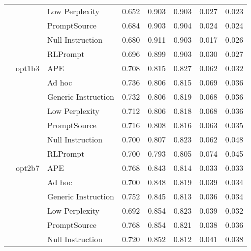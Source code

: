 \begin{supertabular}{lllrrrrr}
              &        & Low Perplexity &            0.652 &           0.903 &          0.903 &        0.027 &    0.023 \\
              &        & PromptSource &            0.684 &           0.903 &          0.904 &        0.024 &    0.024 \\
              &        & Null Instruction &            0.680 &           0.911 &          0.903 &        0.017 &    0.026 \\
              &        & RLPrompt &            0.696 &           0.899 &          0.903 &        0.030 &    0.027 \\
              & opt1b3 & APE &            0.708 &           0.815 &          0.827 &        0.062 &    0.032 \\
              &        & Ad hoc &            0.736 &           0.806 &          0.815 &        0.069 &    0.036 \\
              &        & Generic Instruction &            0.732 &           0.806 &          0.819 &        0.068 &    0.036 \\
              &        & Low Perplexity &            0.712 &           0.806 &          0.818 &        0.068 &    0.036 \\
              &        & PromptSource &            0.716 &           0.808 &          0.816 &        0.063 &    0.035 \\
              &        & Null Instruction &            0.700 &           0.807 &          0.823 &        0.062 &    0.048 \\
              &        & RLPrompt &            0.700 &           0.793 &          0.805 &        0.074 &    0.045 \\
              & opt2b7 & APE &            0.768 &           0.843 &          0.814 &        0.033 &    0.033 \\
              &        & Ad hoc &            0.700 &           0.848 &          0.819 &        0.039 &    0.034 \\
              &        & Generic Instruction &            0.752 &           0.845 &          0.813 &        0.036 &    0.034 \\
              &        & Low Perplexity &            0.692 &           0.854 &          0.823 &        0.039 &    0.032 \\
              &        & PromptSource &            0.768 &           0.854 &          0.821 &        0.038 &    0.036 \\
              &        & Null Instruction &            0.720 &           0.852 &          0.812 &        0.041 &    0.038 \\

\end{supertabular}
